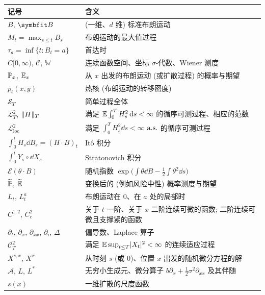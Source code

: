 \begin{center}
\small\renewcommand{\arraystretch}{1.1}
\begin{tabular}{>{\raggedright\arraybackslash}p{} >{\raggedright\arraybackslash}p{}}
\toprule
\textbf{记号} & \textbf{含义} \\
\midrule
$B$, $\rvec{B}$ & (一维、$d$ 维) 标准布朗运动 \\
$M_t=\max_{s\le t}B_s$ & 布朗运动的最大值过程 \\
$\tau_a=\inf\{t:B_t=a\}$ & 首达时 \\
$C[0,\infty)$, $\mathcal{C}$, $\mathbb{W}$ & 连续函数空间、坐标 $\sigma$-代数、Wiener 测度 \\
$\P_x$, $\E_x$ & 从 $x$ 出发的布朗运动 (或扩散过程) 的概率与期望 \\
$p_t(x,y)$ & 热核 (布朗运动的转移密度) \\
$\mathscr{S}_T$ & 简单过程全体 \\
$\mathscr{L}^2_T$, $\norm{H}_T$ & 满足 $\E\int_0^TH_s^2\dd s<\infty$ 的循序可测过程、相应的范数 \\
$\mathscr{L}^2_{\mathrm{loc}}$ & 满足 $\int_0^TH_s^2\dd s<\infty$ $\as$ 的循序可测过程 \\
$\int_0^tH_s\dd B_s=(H\cdot B)_t$ & It\^o 积分 \\
$\int_0^tY_s\circ\dd X_s$ & Stratonovich 积分 \\
$\mathscr{E}(\theta\cdot B)$ & 随机指数 $\exp\big(\int\theta\dd B-\frac12\int\theta^2\dd s\big)$ \\
$\widetilde{\P}$, $\widetilde{\E}$ & 变换后的 (例如风险中性) 概率测度与期望 \\
$L_t$, $L^a_t$ & 布朗运动在 $0$、在 $a$ 处的局部时 \\
$C^{1,2}$, $C^2_c$ & 关于 $t$ 一阶、关于 $x$ 二阶连续可微的函数; 二阶连续可微且支撑紧的函数 \\
$\partial_t$, $\partial_x$, $\partial_{xx}$, $\partial_i$, $\Delta$ & 偏导数、Laplace 算子 \\
$\mathscr{C}^2_T$ & 满足 $\E\sup_{t\le T}\abs{X_t}^2<\infty$ 的连续适应过程 \\
$X^{s,x}$, $X^x$ & 从时刻 $s$ (或 $0$)、位置 $x$ 出发的随机微分方程的解 \\
$\mathcal{A}$, $L$, $L^*$ & 无穷小生成元、微分算子 $b\partial_x+\frac12\sigma^2\partial_{xx}$ 及其伴随 \\
$s(x)$ & 一维扩散的尺度函数 \\
\bottomrule
\end{tabular}
\end{center}
